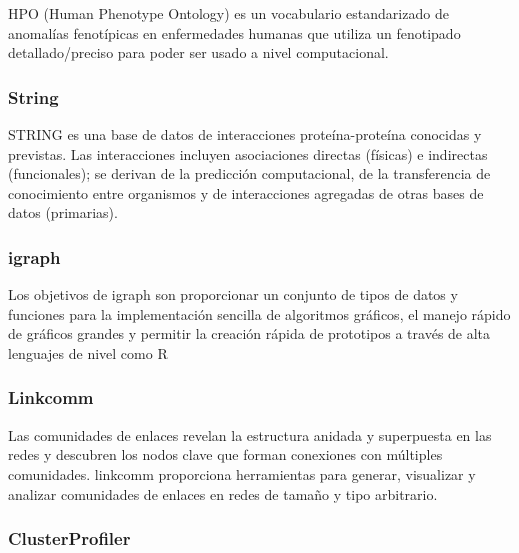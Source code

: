 HPO (Human Phenotype Ontology)\cite{HPO_paper} es un vocabulario estandarizado de anomalías fenotípicas en enfermedades humanas que utiliza un fenotipado detallado/preciso para poder ser usado a nivel computacional.

\hfill

\subsubsection{String}

STRING \cite{String_paper} es una base de datos de interacciones proteína-proteína conocidas y previstas. Las interacciones incluyen asociaciones directas (físicas) e indirectas (funcionales); se derivan de la predicción computacional, de la transferencia de conocimiento entre organismos y de interacciones agregadas de otras bases de datos (primarias).

\subsubsection{igraph}

Los objetivos de igraph son proporcionar un conjunto de tipos de datos y funciones para la implementación sencilla de algoritmos gráficos, el manejo rápido de gráficos grandes y permitir la creación rápida de prototipos a través de alta lenguajes de nivel como R

\subsubsection{Linkcomm}

Las comunidades de enlaces revelan la estructura anidada y superpuesta en las redes y descubren los nodos clave que forman conexiones con múltiples comunidades. linkcomm \cite{Linkcomm_paper} proporciona herramientas para generar, visualizar y analizar comunidades de enlaces en redes de tamaño y tipo arbitrario.

\subsubsection{ClusterProfiler}





\hfill




\newpage